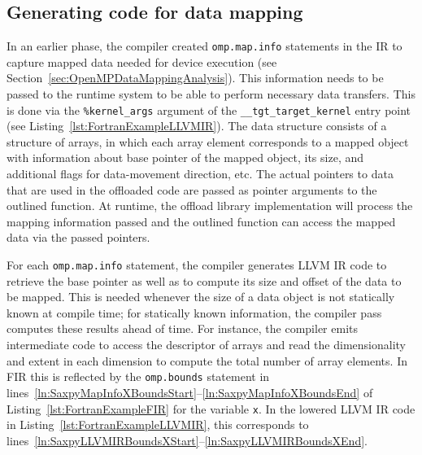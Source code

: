 \documentclass[acmtog,natbib=false]{acmart}
\newcommand{\code}[1]{\texttt{#1}\xspace}
\begin{document}
\subsection{Generating code for data mapping}
\label{sec:HandlingDataMapping}


In an earlier phase, the compiler created \code{omp.map.info} statements in the \ac{IR} to capture mapped data needed for device execution (see Section~\ref{sec:OpenMPDataMappingAnalysis}).
This information needs to be passed to the runtime system to be able to perform necessary data transfers.
This is done via the \code{\%kernel\_args} argument of the \code{\_\_tgt\_target\_kernel} entry point (see Listing~\ref{lst:FortranExampleLLVMIR}).
The data structure consists of a structure of arrays, in which each array element corresponds to a mapped object with information about base pointer of the mapped object, its size, and additional flags for data-movement direction, etc.
The actual pointers to data that are used in the offloaded code are passed as pointer arguments to the outlined function.
At runtime, the offload library implementation will process the mapping information passed and the outlined function can access the mapped data via the passed pointers.



For each \code{omp.map.info} statement, the compiler generates LLVM \ac{IR} code to retrieve the base pointer as well as to compute its size and offset of the data to be mapped.
This is needed whenever the size of a data object is not statically known at compile time; for statically known information, the compiler pass computes these results ahead of time.
For instance, the compiler emits intermediate code to access the descriptor of arrays and read the dimensionality and extent in each dimension to compute the total number of array elements.
In \ac{FIR} this is reflected by the \code{omp.bounds} statement in lines~\ref{ln:SaxpyMapInfoXBoundsStart}--\ref{ln:SaxpyMapInfoXBoundsEnd} of Listing~\ref{lst:FortranExampleFIR} for the variable \code{x}.
In the lowered LLVM \ac{IR} code in Listing~\ref{lst:FortranExampleLLVMIR}, this corresponds to lines~\ref{ln:SaxpyLLVMIRBoundsXStart}--\ref{ln:SaxpyLLVMIRBoundsXEnd}.
\end{document}
